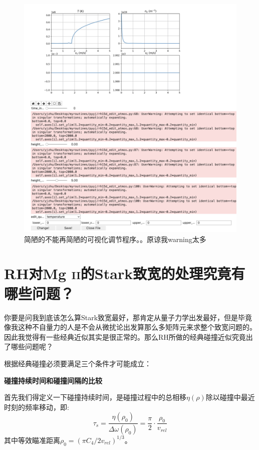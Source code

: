 \begin{figure}
	\centering
	\includegraphics[width=\textwidth]{figs/naive}
	\caption{简陋的不能再简陋的可视化调节程序。。原谅我warning太多}
	\label{fig:a.1.2}
\end{figure}

\section{RH对Mg \textsc{ii}的Stark致宽的处理究竟有哪些问题？}\label{sec:a.2}
你要是问我到底该怎么算Stark致宽最好，那肯定从量子力学出发最好，但是毕竟像我这种不自量力的人是不会从微扰论出发算那么多矩阵元来求整个致宽问题的。因此我觉得有一些经典近似其实是很正常的。那么RH所做的经典碰撞近似究竟出了哪些问题呢？

根据\textcites{Mihalas2014}经典碰撞必须要满足三个条件才可能成立：

\textbf{碰撞持续时间和碰撞间隔的比较}

首先我们得定义一下碰撞持续时间，是碰撞过程中的总相移$\eta(\rho)$除以碰撞中最近时刻的频率移动，即\parencites{Mihalas2014}:
\begin{equation}
	\tau_{s}=\frac{\eta\left(\rho_{0}\right)}{\Delta \omega\left(\rho_{0}\right)}=\frac{\pi}{2} \cdot \frac{\rho_{0}}{v_{r e l}}
\end{equation}
其中等效瞄准距离$\rho_{0}=\left(\pi C_{4} / 2 v_{r e l}\right)^{1 / 3}$。

